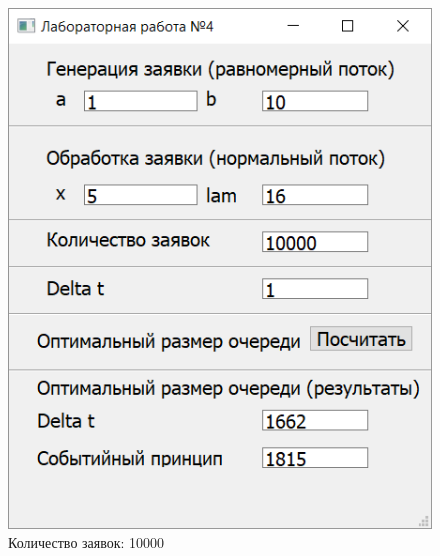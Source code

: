 \begin{figure}
	\centering
	\includegraphics[width=0.7\linewidth]{src/result_100000}
	\caption{Количество заявок: 10000}
	\label{fig:result100000}
\end{figure}


